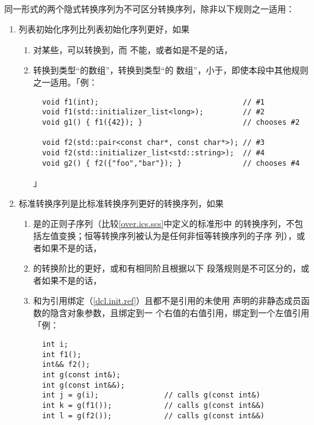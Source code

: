 \paragraph{}
同一形式的两个隐式转换序列为不可区分转换序列，除非以下规则之一适用：
\begin{enumerate}
  \item{列表初始化序列比列表初始化序列更好，如果
    \begin{enumerate}
      \item{对某些，可以转换到，而
        不能，或者如是不是的话，}
      \item{转换到类型``的数组''，转换到类型``的
        数组''，小于，即使本段中其他规则之一适用。「例：
\begin{lstlisting}
  void f1(int);                                 // #1
  void f1(std::initializer_list<long>);         // #2
  void g1() { f1({42}); }                       // chooses #2

  void f2(std::pair<const char*, const char*>); // #3
  void f2(std::initializer_list<std::string>);  // #4
  void g2() { f2({"foo","bar"}); }              // chooses #4
\end{lstlisting}」}
    \end{enumerate}}
  \item{标准转换序列是比标准转换序列更好的转换序列，如果
    \begin{enumerate}
      \item{是的正则子序列（比较\ref{over.ics.scs}中定义的标准形中
        的转换序列，不包括左值变换；恒等转换序列被认为是任何非恒等转换序列的子序
        列），或者如果不是的话，}
      \item{的转换阶比的更好，或和有相同阶且根据以下
        段落规则是不可区分的，或者如果不是的话，}
      \item{和为引用绑定（\ref{dcl.init.ref}）且都不是引用的未使用
        声明的非静态成员函数的隐含对象参数，且绑定到一
        个右值的右值引用，绑定到一个左值引用「例：
\begin{lstlisting}
  int i;
  int f1();
  int&& f2();
  int g(const int&);
  int g(const int&&);
  int j = g(i);               // calls g(const int&)
  int k = g(f1());            // calls g(const int&&)
  int l = g(f2());            // calls g(const int&&)


\end{lstlisting}}
\end{enumerate}}
\end{enumerate}
